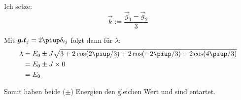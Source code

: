 Ich setze:
\[
	\vec k := \frac{\vec g_1 - \vec g_2}3
\]

Mit $\vec g_i \vec t_j = 2 \piup \delta_{ij}$ folgt dann für $\lambda$:
\begin{align*}
	\lambda
	&= E_0 \pm J \sqrt{3 + 2\cos(2\piup/3) + 2 \cos(-2\piup/3) + 2 \cos(4\piup/3)} \\
	&= E_0 \pm J \times 0 \\
	&= E_0
\end{align*}

Somit haben beide ($\pm$) Energien den gleichen Wert und sind entartet.


\IfFileExists{\bibliographyfile}{
	
}{}



